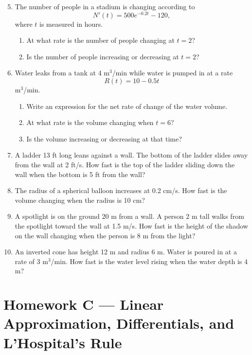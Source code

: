 \documentclass[11pt]{article}
\begin{document}
\begin{enumerate}
    \setcounter{enumi}{4}

    \item The number of people in a stadium is changing according to
    \[
    N'(t)=500e^{-0.2t}-120,
    \]
    where \(t\) is measured in hours.
    \begin{enumerate}
        \item At what rate is the number of people changing at \(t=2\)?
        \item Is the number of people increasing or decreasing at \(t=2\)?
    \end{enumerate}

    \item Water leaks from a tank at 4 m\(^3\)/min while water is pumped in at a rate
    \[
    R(t)=10-0.5t
    \]
    m\(^3\)/min.
    \begin{enumerate}
        \item Write an expression for the net rate of change of the water volume.
        \item At what rate is the volume changing when \(t=6\)?
        \item Is the volume increasing or decreasing at that time?
    \end{enumerate}

    \item A ladder 13 ft long leans against a wall. The bottom of the ladder slides away from the wall at 2 ft/s.
    How fast is the top of the ladder sliding down the wall when the bottom is 5 ft from the wall?

    \item The radius of a spherical balloon increases at 0.2 cm/s.  
    How fast is the volume changing when the radius is 10 cm?

    \item A spotlight is on the ground 20 m from a wall. A person 2 m tall walks from the spotlight toward the wall at 1.5 m/s.
    How fast is the height of the shadow on the wall changing when the person is 8 m from the light?

    \item An inverted cone has height 12 m and radius 6 m. Water is poured in at a rate of 3 m\(^3\)/min.
    How fast is the water level rising when the water depth is 4 m?
\end{enumerate}

\bigskip
\newpage
\section*{Homework C --- Linear Approximation, Differentials, and L'Hospital's Rule}
\end{document}
